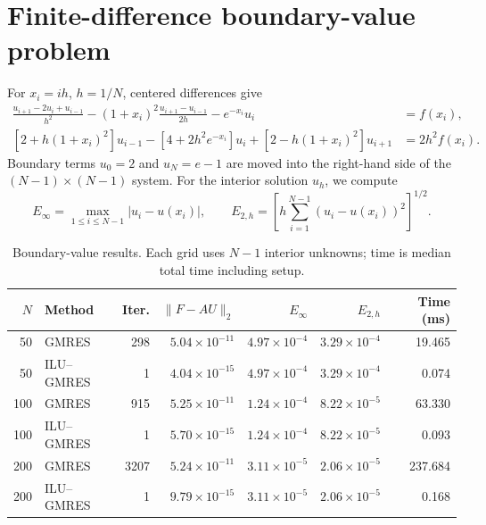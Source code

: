 \documentclass[a4paper,11pt]{article}
\begin{document}
\section{Finite-difference boundary-value problem}
For $x_i=ih$, $h=1/N$, centered differences give
\begin{align}
\frac{u_{i+1}-2u_i+u_{i-1}}{h^2}
-(1+x_i)^2\frac{u_{i+1}-u_{i-1}}{2h}
-e^{-x_i}u_i&=f(x_i),\\
[2+h(1+x_i)^2]u_{i-1}-[4+2h^2e^{-x_i}]u_i
+[2-h(1+x_i)^2]u_{i+1}&=2h^2f(x_i).
\end{align}
Boundary terms $u_0=2$ and $u_N=e-1$ are moved into the right-hand side of the $(N-1)\times(N-1)$ system. For the interior solution $u_h$, we compute
\begin{equation}
E_\infty=\max_{1\leq i\leq N-1}|u_i-u(x_i)|,\qquad
E_{2,h}=\left[h\sum_{i=1}^{N-1}(u_i-u(x_i))^2\right]^{1/2}.
\end{equation}
\begin{table}[ht]\centering\small
\caption{Boundary-value results. Each grid uses $N-1$ interior unknowns; time is median total time including setup.}
\begin{tabular}{rlrrrrr}\toprule
$N$ & Method & Iter. & $\|F-AU\|_2$ & $E_\infty$ & $E_{2,h}$ & Time (ms)\\\midrule
50 & GMRES & 298 & $5.04\times10^{-11}$ & $4.97\times10^{-4}$ & $3.29\times10^{-4}$ & 19.465 \\
50 & ILU--GMRES & 1 & $4.04\times10^{-15}$ & $4.97\times10^{-4}$ & $3.29\times10^{-4}$ & 0.074 \\
\midrule
100 & GMRES & 915 & $5.25\times10^{-11}$ & $1.24\times10^{-4}$ & $8.22\times10^{-5}$ & 63.330 \\
100 & ILU--GMRES & 1 & $5.70\times10^{-15}$ & $1.24\times10^{-4}$ & $8.22\times10^{-5}$ & 0.093 \\
\midrule
200 & GMRES & 3207 & $5.24\times10^{-11}$ & $3.11\times10^{-5}$ & $2.06\times10^{-5}$ & 237.684 \\
200 & ILU--GMRES & 1 & $9.79\times10^{-15}$ & $3.11\times10^{-5}$ & $2.06\times10^{-5}$ & 0.168 \\
\bottomrule\end{tabular}\end{table}
\end{document}
